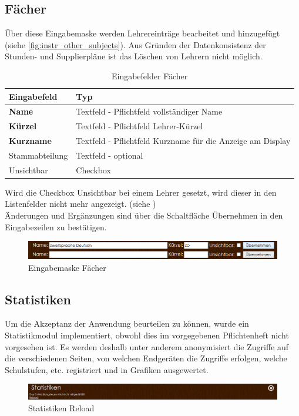 \subsection{Fächer}
Über diese Eingabemaske werden Lehrereinträge bearbeitet und hinzugefügt (siehe \autoref{fig:instr_other_subjects}). Aus Gründen der Datenkonsistenz der Stunden- und Supplierpläne ist das Löschen von Lehrern nicht möglich.
\begin{table}[H]
\centering
\begin{tabular}{p{3 cm}p{10 cm}}
   \toprule
   \textbf{Eingabefeld} & \textbf{Typ} \\
   \midrule
          \textbf{Name} & Textfeld - Pflichtfeld \newline vollständiger Name \\
          \hline
          \textbf{Kürzel} & Textfeld - Pflichtfeld \newline Lehrer-Kürzel \\
          \hline
          \textbf{Kurzname} & Textfeld - Pflichtfeld \newline Kurzname für die Anzeige am Display \\
          \hline
          Stammabteilung & Textfeld - optional \\
          \hline
          Unsichtbar & Checkbox \\
   \bottomrule
\end{tabular}
\caption{Eingabefelder Fächer}
\end{table}
Wird die Checkbox Unsichtbar bei einem Lehrer gesetzt, wird dieser in den Listenfelder nicht mehr angezeigt. (siehe )\\
Änderungen und Ergänzungen sind über die Schaltfläche Übernehmen in den Eingabezeilen zu bestätigen.
\begin{figure}[H]
\centering
\includegraphics[keepaspectratio=true, width=14cm]{images/screenshots/subjects_input.png}
\caption{Eingabemaske Fächer}
\label{fig:instr_other_subjects}
\end{figure}
\subsection{Statistiken}
Um die Akzeptanz der Anwendung beurteilen zu können, wurde ein Statistikmodul implementiert, obwohl dies im vorgegebenen Pflichtenheft nicht vorgesehen ist. Es werden deshalb unter anderem anonymisiert die Zugriffe auf die verschiedenen Seiten, von welchen Endgeräten die Zugriffe erfolgen, welche Schulstufen, etc. registriert und in Grafiken ausgewertet.
\begin{figure}[H]
\centering
\includegraphics[keepaspectratio=true, width=14cm]{images/screenshots/statistics_header.png}
\caption{Statistiken Reload}
\label{fig:instr_other_statistics_header}
\end{figure}
